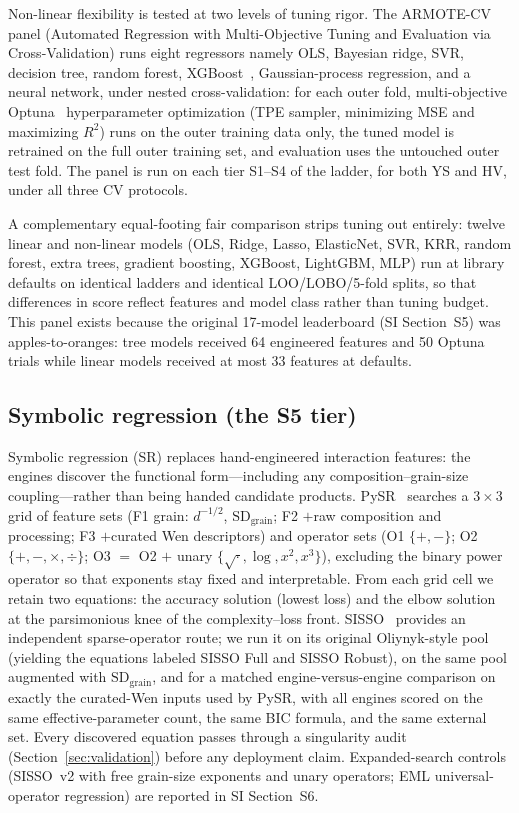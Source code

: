 \documentclass[5p,times,twocolumn]{elsarticle}
\begin{document}
Non-linear flexibility is tested at two levels of tuning rigor. The ARMOTE-CV panel (Automated Regression with Multi-Objective Tuning and Evaluation via Cross-Validation) runs eight regressors namely OLS, Bayesian ridge, SVR, decision tree, random forest, XGBoost~\cite{Chen2016XGBoost}, Gaussian-process regression, and a neural network, under nested cross-validation: for each outer fold, multi-objective Optuna~\cite{Akiba2019Optuna} hyperparameter optimization (TPE sampler, minimizing MSE and maximizing $R^2$) runs on the outer training data only, the tuned model is retrained on the full outer training set, and evaluation uses the untouched outer test fold. The panel is run on each tier S1--S4 of the ladder, for both YS and HV, under all three CV protocols.

A complementary equal-footing fair comparison strips tuning out entirely: twelve linear and non-linear models (OLS, Ridge, Lasso, ElasticNet, SVR, KRR, random forest, extra trees, gradient boosting, XGBoost, LightGBM, MLP) run at library defaults on identical ladders and identical LOO/LOBO/5-fold splits, so that differences in score reflect features and model class rather than tuning budget. This panel exists because the original 17-model leaderboard (SI Section~S5) was apples-to-oranges: tree models received 64 engineered features and 50 Optuna trials while linear models received at most 33 features at defaults.

\subsection{Symbolic regression (the S5 tier)}
\label{sec:methods_sr}

Symbolic regression (SR) replaces hand-engineered interaction features: the engines discover the functional form---including any composition--grain-size coupling---rather than being handed candidate products. PySR~\cite{Cranmer2023PySR} searches a $3\times3$ grid of feature sets (F1 grain: $d^{-1/2}$, $\text{SD}_\text{grain}$; F2 $+$raw composition and processing; F3 $+$curated Wen descriptors) and operator sets (O1 $\{+,-\}$; O2 $\{+,-,\times,\div\}$; O3 $=$ O2 $+$ unary $\{\sqrt{\cdot}, \log, x^2, x^3\}$), excluding the binary power operator so that exponents stay fixed and interpretable. From each grid cell we retain two equations: the accuracy solution (lowest loss) and the elbow solution at the parsimonious knee of the complexity--loss front. SISSO~\cite{Ouyang2018SISSO} provides an independent sparse-operator route; we run it on its original Oliynyk-style pool~\cite{Oliynyk2016} (yielding the equations labeled SISSO Full and SISSO Robust), on the same pool augmented with $\text{SD}_\text{grain}$, and for a matched engine-versus-engine comparison on exactly the curated-Wen inputs used by PySR, with all engines scored on the same effective-parameter count, the same BIC formula, and the same external set. Every discovered equation passes through a singularity audit (Section~\ref{sec:validation}) before any deployment claim. Expanded-search controls (SISSO~v2 with free grain-size exponents and unary operators; EML universal-operator regression) are reported in SI Section~S6.
\end{document}
